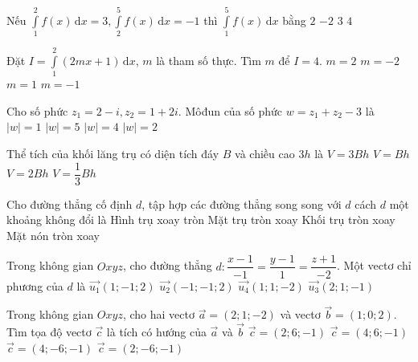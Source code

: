 \begin{ex}%
	Nếu $\displaystyle\int\limits_1^2 f(x)\mathrm{\,d}x=3,\displaystyle\int\limits_2^5 f(x)\mathrm{\,d}x=-1$ thì $\displaystyle\int\limits_1^5 f(x)\mathrm{\,d}x$ bằng
	\choice
	{\True $2$}
	{$-2$}
	{$3$}
	{$4$}
	\loigiai{
	\[\displaystyle\int\limits_1^5 f(x)\mathrm{\,d}x=\displaystyle\int\limits_1^2 f(x)\mathrm{\,d}x+\displaystyle\int\limits_2^5 f(x)\mathrm{\,d}x=3-1=2.\]}
\end{ex}
\begin{ex}%
	Đặt $I=\displaystyle\int\limits_1^2(2mx+1)\mathrm{\,d}x$, $m$ là tham số thực. Tìm $m$ để $I=4$. 
	\choice
	{$m=2$}
	{$m=-2$}
	{\True $m=1$}
	{$m=-1$}
	\loigiai{
	\[I=\displaystyle\int\limits_1^2(2mx+1)\mathrm{\,d}x=\left(mx^2+x\right)\bigg|_1^2 =4m+2-m-1=3m+1 \Rightarrow I=4\Leftrightarrow m=1.\]}
\end{ex}
\begin{ex}%
	Cho số phức $z_1=2-i, z_2=1+2i$. Môđun của số phức $w=z_1+z_2-3$ là
	\choice
	{\True $|w|=1$}
	{$|w|=5$}
	{$|w|=4$}
	{$|w|=2$}
\end{ex}
\begin{ex}%
	Thể tích của khối lăng trụ có diện tích đáy $B$ và chiều cao $3h$ là
	\choice
	{\True $V=3Bh$}
	{$V=Bh$}
	{$V=2Bh$}
	{$V=\dfrac{1}{3}Bh$}
\end{ex}
\begin{ex}%
	Cho đường thẳng cố định $d$, tập hợp các đường thẳng song song với $d$ cách $d$ một khoảng không đổi là
	\choice
	{Hình trụ xoay tròn}
	{\True Mặt trụ tròn xoay}
	{Khối trụ tròn xoay}
	{Mặt nón tròn xoay}
\end{ex}
\begin{ex}%
	Trong không gian $Oxyz$, cho đường thẳng $d\colon\dfrac{x-1}{-1}=\dfrac{y-1}{1}=\dfrac{z+1}{-2}$. Một vectơ chỉ phương của $d$ là 
	\choice
	{\True $\overrightarrow{u_1}(1;-1; 2)$}
	{$\overrightarrow{u_2}(-1;-1; 2)$}
	{$\overrightarrow{u_4}(1; 1;-2)$}
	{$\overrightarrow{u_3}(2; 1;-1)$}
\end{ex}
\begin{ex}%
	Trong không gian $Oxyz$, cho hai vectơ $\overrightarrow{a}=(2; 1;-2)$ và vectơ $\overrightarrow{b}=(1; 0; 2)$. Tìm tọa độ vectơ $\overrightarrow{c}$ là tích có hướng của $\overrightarrow{a}$ và $\overrightarrow{b}$ 
	\choice
	{$\overrightarrow{c}=(2; 6;-1)$}
	{$\overrightarrow{c}=(4; 6;-1)$}
	{$\overrightarrow{c}=(4;-6;-1)$}
	{\True $\overrightarrow{c}=(2;-6;-1)$}
\end{ex}
